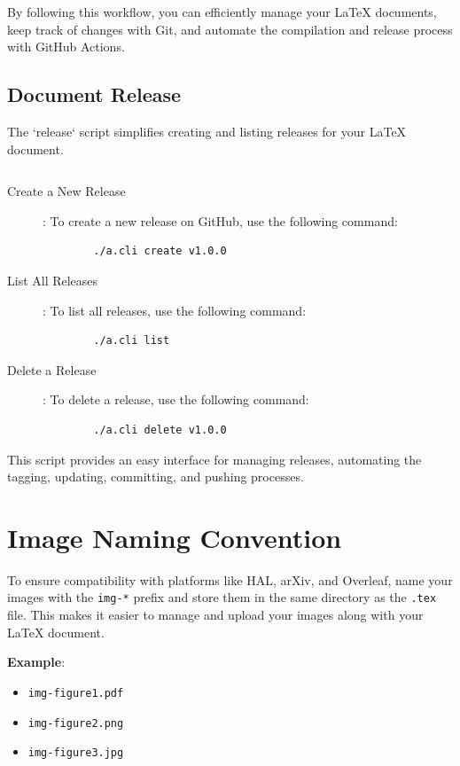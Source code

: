 \documentclass[a4paper]{article}
\begin{document}
By following this workflow, you can efficiently manage your \LaTeX{} documents, keep track of changes with Git, and automate the compilation and release process with GitHub Actions.

\subsection{Document Release}

The `release` script simplifies creating and listing releases for your \LaTeX{} document.

\inputminted[linenos, fontsize=\small, bgcolor=background,firstline=25,lastline=66]{sh}{a.cli}



\begin{description}
    \item[Create a New Release]: To create a new release on GitHub, use the following command:
    \begin{verbatim}
        ./a.cli create v1.0.0
    \end{verbatim}
    \item[List All Releases]: To list all releases, use the following command:
    \begin{verbatim}
        ./a.cli list
    \end{verbatim}
    \item[Delete a Release]: To delete a release, use the following command:
    \begin{verbatim}
        ./a.cli delete v1.0.0
    \end{verbatim}

\end{description}

This script provides an easy interface for managing releases, automating the tagging, updating, committing, and pushing processes.


\section{Image Naming Convention}

To ensure compatibility with platforms like HAL, arXiv, and Overleaf, name your images with the \texttt{img-*} prefix and store them in the same directory as the \texttt{.tex} file.
This makes it easier to manage and upload your images along with your \LaTeX{} document.

\textbf{Example}:
\begin{itemize}
    \item \texttt{img-figure1.pdf}
    \item \texttt{img-figure2.png}
    \item \texttt{img-figure3.jpg}
\end{itemize}
\end{document}
